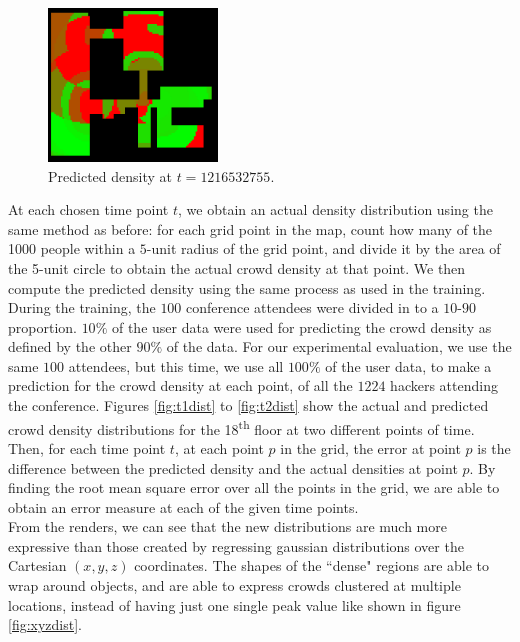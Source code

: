 \documentclass[letterpaper]{article}
\begin{document}
\begin{figure}[h!]
  \centering
    \includegraphics[width=170px]{diagrams/26-27_86-83_59-49_1216532755_predicted.png}
  \caption{Predicted density at $t=1216532755$.}
  \label{fig:t4dist}
\end{figure}

At each chosen time point $t$, we obtain an actual density distribution using the same method as before: for each grid point in the map, count how many of the 1000 people within a $5$-unit radius of the grid point, and divide it by the area of the 5-unit circle to obtain the actual crowd density at that point. We then compute the predicted density using the same process as used in the training.\\

During the training, the $100$ conference attendees were divided in to a $10$-$90$ proportion. $10\%$ of the user data were used for predicting the crowd density as defined by the other $90\%$ of the data. For our experimental evaluation, we use the same $100$ attendees, but this time, we use all $100\%$ of the user data, to make a prediction for the crowd density at each point, of all the $1224$ hackers attending the conference. Figures \ref{fig:t1dist} to \ref{fig:t2dist} show the actual and predicted crowd density distributions for the 18\textsuperscript{th} floor at two different points of time.\\

Then, for each time point $t$, at each point $p$ in the grid, the error at point $p$ is the difference between the predicted density and the actual densities at point $p$. By finding the root mean square error over all the points in the grid, we are able to obtain an error measure at each of the given time points.\\



From the renders, we can see that the new distributions are much more expressive than those created by regressing gaussian distributions over the Cartesian $(x,y,z)$ coordinates. The shapes of the ``dense" regions are able to wrap around objects, and are able to express crowds clustered at multiple locations, instead of having just one single peak value like shown in figure \ref{fig:xyzdist}.
\end{document}
